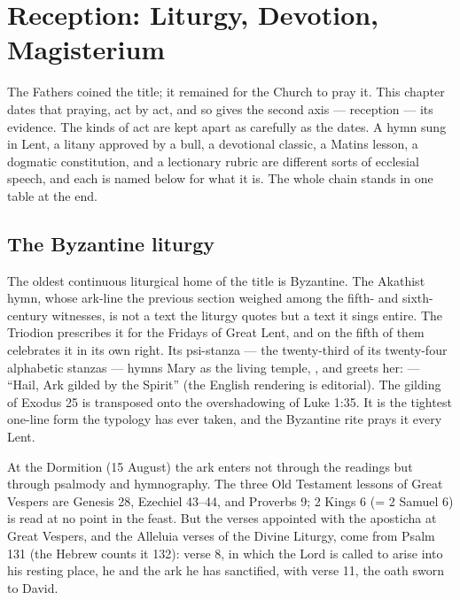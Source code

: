 \sectionguard
\section{Reception: Liturgy, Devotion, Magisterium}

The Fathers coined the title; it remained for the Church to pray it. This
chapter dates that praying, act by act, and so gives the second axis ---
reception --- its evidence. The kinds of act are
kept apart as carefully as the dates. A hymn sung in Lent, a litany approved
by a bull, a devotional classic, a Matins lesson, a dogmatic constitution,
and a lectionary rubric are different sorts of ecclesial speech, and each is
named below for what it is. The whole chain stands in one table at the end.

\subsection{The Byzantine liturgy}

The oldest continuous liturgical home of the title is Byzantine. The
Akathist hymn, whose ark-line the previous section weighed among the fifth-
and sixth-century witnesses, is not a text the liturgy quotes but a text it
sings entire. The Triodion prescribes it for the Fridays of Great Lent, and
on the fifth of them celebrates it in its own right. Its psi-stanza --- the
twenty-third of its twenty-four alphabetic stanzas --- hymns Mary as the
living temple, , and greets her:  --- ``Hail, Ark gilded by the Spirit'' (the
English rendering is editorial). The gilding of Exodus 25 is transposed onto
the overshadowing of Luke 1:35. It is the tightest one-line form the
typology has ever taken, and the Byzantine rite prays it every
Lent.

At the Dormition (15 August) the ark enters not through the readings but
through psalmody and hymnography. The three Old Testament lessons of Great
Vespers are Genesis 28, Ezechiel 43--44, and Proverbs 9; 2 Kings 6 (= 2
Samuel 6) is read at no point in the feast. But the verses appointed with
the aposticha at Great Vespers, and the Alleluia verses of the Divine
Liturgy, come from Psalm 131 (the Hebrew counts it 132): verse 8, in which
the Lord is called to arise into his resting place, he and the ark he has
sanctified, with verse 11, the oath sworn to David.

